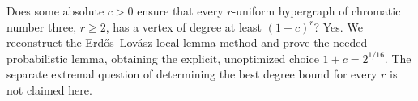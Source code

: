 Does some absolute $c>0$ ensure that every $r$-uniform hypergraph of chromatic number three, $r\ge2$, has a vertex of degree at least $(1+c)^r$? Yes. We reconstruct the Erd\H{o}s--Lov\'asz local-lemma method and prove the needed probabilistic lemma, obtaining the explicit, unoptimized choice $1+c=2^{1/16}$. The separate extremal question of determining the best degree bound for every $r$ is not claimed here.
